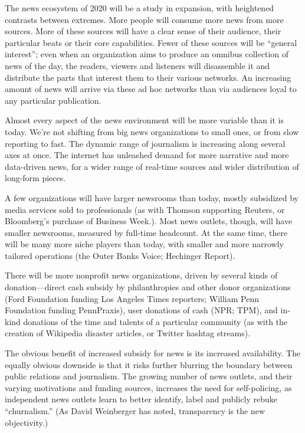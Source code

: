 The news ecosystem of 2020 will be a study in expansion, with heightened
contrasts between extremes. More people will consume more news from more
sources. More of these sources will have a clear sense of their audience, their
particular beats or their core capabilities. Fewer of these sources will be ``general
interest''; even when an organization aims to produce an omnibus collection of
news of the day, the readers, viewers and listeners will disassemble it and distribute
the parts that interest them to their various networks. An increasing amount
of news will arrive via these ad hoc networks than via audiences loyal to any
particular publication.

Almost every aspect of the news environment will be more variable than it is
today. We’re not shifting from big news organizations to small ones, or from slow
reporting to fast. The dynamic range of journalism is increasing along several
axes at once. The internet has unleashed demand for more narrative and more
data-driven news, for a wider range of real-time sources and wider distribution
of long-form pieces.

A few organizations will have larger newsrooms than today, mostly subsidized
by media services sold to professionals (as with Thomson supporting Reuters, or
Bloomberg’s purchase of Business Week.). Most news outlets, though, will have
smaller newsrooms, measured by full-time headcount. At the same time, there
will be many more niche players than today, with smaller and more narrowly
tailored operations (the Outer Banks Voice; Hechinger Report).

There will be more nonprofit news organizations, driven by several kinds of
donation—direct cash subsidy by philanthropies and other donor organizations
(Ford Foundation funding Los Angeles Times reporters; William Penn Foundation
funding PennPraxis), user donations of cash (NPR; TPM), and in-kind
donations of the time and talents of a particular community (as with the creation
of Wikipedia disaster articles, or Twitter hashtag streams).

The obvious benefit of increased subsidy for news is its increased availability. The
equally obvious downside is that it risks further blurring the boundary between
public relations and journalism. The growing number of news outlets, and their
varying motivations and funding sources, increases the need for self-policing, as
independent news outlets learn to better identify, label and publicly rebuke ``churnalism.''
(As David Weinberger has noted, transparency is the new objectivity.)

